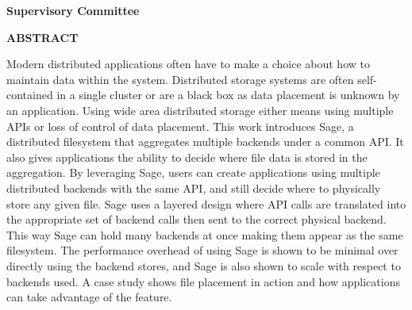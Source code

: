 \newpage
{}

\noindent \textbf{Supervisory Committee}
\tpbreak
\panel

\begin{center}
\textbf{ABSTRACT}
\end{center}


Modern distributed applications often have to make a choice about how to
maintain data within the system. Distributed storage systems are often self-
contained in a single cluster or are a black box as data placement is unknown
by an application. Using wide area distributed storage either means using
multiple APIs or loss of control of data placement. This work introduces Sage,
a distributed filesystem that aggregates multiple backends under a common API.
It also gives applications the ability to decide where file data is stored in
the aggregation. By leveraging Sage, users can create applications using
multiple distributed backends with the same API, and still decide where to
physically store any given file. Sage uses a layered design where API calls
are translated into the appropriate set of backend calls then sent to the
correct physical backend. This way Sage can hold many backends at once making
them appear as the same filesystem. The performance overhead of using Sage is
shown to be minimal over directly using the backend stores, and Sage is also
shown to scale with respect to backends used. A case study shows file
placement in action and how applications can take advantage of the feature.
